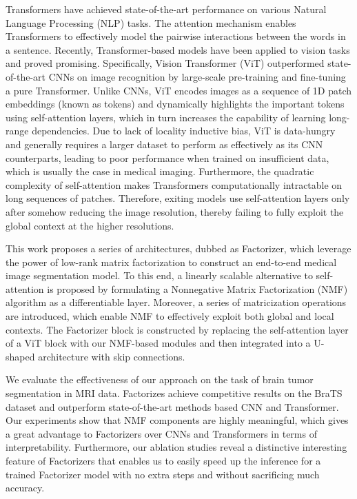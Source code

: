 \documentclass[a4,12pt]{article}
\begin{document}
	Transformers \cite{vaswani2017attention} have achieved state-of-the-art performance on various Natural Language Processing (NLP) tasks. The attention mechanism enables Transformers to effectively model the pairwise interactions between the words in a sentence. Recently, Transformer-based models have been applied to vision tasks and proved promising. Specifically, Vision Transformer (ViT) \citep{dosovitskiy2020image} outperformed state-of-the-art CNNs on image recognition by large-scale pre-training and fine-tuning a pure Transformer. Unlike CNNs, ViT encodes images as a sequence of 1D patch embeddings (known as tokens) and dynamically highlights the important tokens using self-attention layers, which in turn increases the capability of learning long-range dependencies. Due to lack of locality inductive bias, ViT is data-hungry and generally requires a larger dataset to perform as effectively as its CNN counterparts, leading to poor performance when trained on insufficient data, which is usually the case in medical imaging. Furthermore, the quadratic complexity of self-attention makes Transformers computationally intractable on long sequences of patches. Therefore, exiting models use self-attention layers only after somehow reducing the image resolution, thereby failing to fully exploit the global context at the higher resolutions.  
	
	This work proposes a series of architectures, dubbed as Factorizer, which leverage the power of low-rank matrix factorization to construct an end-to-end medical image segmentation model. To this end, a linearly scalable alternative to self-attention is proposed by formulating a Nonnegative Matrix Factorization (NMF) algorithm as a differentiable layer. Moreover, a series of matricization operations are introduced, which enable NMF to effectively exploit both global and local contexts. The Factorizer block is constructed by replacing the self-attention layer of a ViT block with our NMF-based modules and then integrated into a U-shaped architecture with skip connections.
	
	We evaluate the effectiveness of our approach on the task of brain tumor segmentation in MRI data. Factorizes achieve competitive results on the BraTS dataset \citep{brats1, brats2, brats3} and outperform state-of-the-art methods based CNN and Transformer. Our experiments show that NMF components are highly meaningful, which gives a great advantage to Factorizers over CNNs and Transformers in terms of interpretability. Furthermore, our ablation studies reveal a distinctive interesting feature of Factorizers that enables us to easily speed up the inference for a trained Factorizer model with no extra steps and without sacrificing much accuracy.
	
\end{document}
